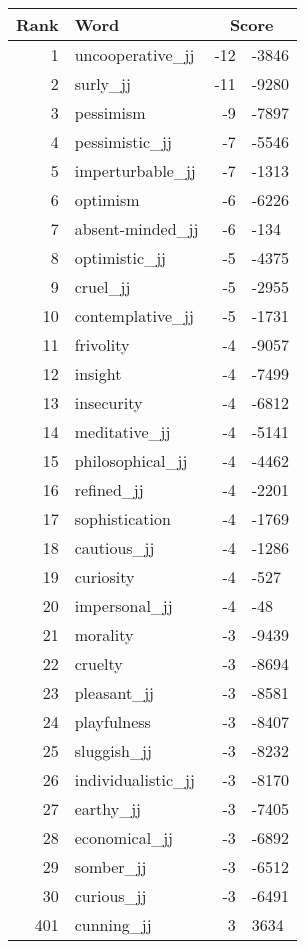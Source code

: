 \begin{longtable}[!htbp]{| rlr@{.}l |}
    \hline
    \textbf{Rank} & \textbf{Word} & \multicolumn{2}{c|}{\textbf{Score}} \\
    \hline
    \endhead
    1 & uncooperative\_jj & -12 & -3846 \\
    2 & surly\_jj & -11 & -9280 \\
    3 & pessimism & -9 & -7897 \\
    4 & pessimistic\_jj & -7 & -5546 \\
    5 & imperturbable\_jj & -7 & -1313 \\
    6 & optimism & -6 & -6226 \\
    7 & absent-minded\_jj & -6 & -134 \\
    8 & optimistic\_jj & -5 & -4375 \\
    9 & cruel\_jj & -5 & -2955 \\
    10 & contemplative\_jj & -5 & -1731 \\
    11 & frivolity & -4 & -9057 \\
    12 & insight & -4 & -7499 \\
    13 & insecurity & -4 & -6812 \\
    14 & meditative\_jj & -4 & -5141 \\
    15 & philosophical\_jj & -4 & -4462 \\
    16 & refined\_jj & -4 & -2201 \\
    17 & sophistication & -4 & -1769 \\
    18 & cautious\_jj & -4 & -1286 \\
    19 & curiosity & -4 & -527 \\
    20 & impersonal\_jj & -4 & -48 \\
    21 & morality & -3 & -9439 \\
    22 & cruelty & -3 & -8694 \\
    23 & pleasant\_jj & -3 & -8581 \\
    24 & playfulness & -3 & -8407 \\
    25 & sluggish\_jj & -3 & -8232 \\
    26 & individualistic\_jj & -3 & -8170 \\
    27 & earthy\_jj & -3 & -7405 \\
    28 & economical\_jj & -3 & -6892 \\
    29 & somber\_jj & -3 & -6512 \\
    30 & curious\_jj & -3 & -6491 \\
    401 & cunning\_jj & 3 & 3634 \\

\end{longtable}
